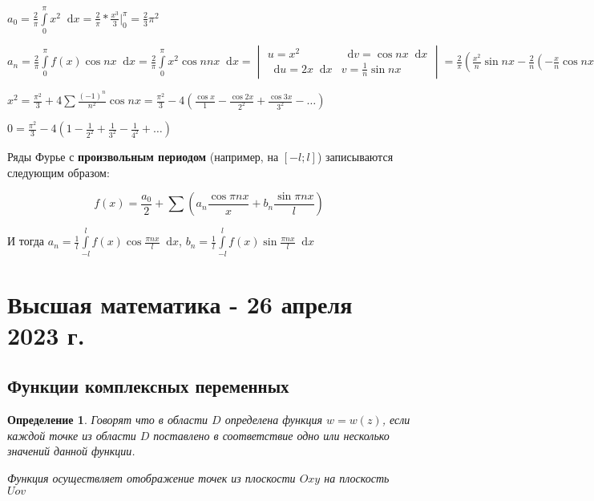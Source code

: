 \documentclass{article}
\newcommand*\diff{\mathop{}\!\mathrm{d}}
\newtheorem{definition}{Определение}
\begin{document}
$a_0 = \frac{2}{\pi} \int\limits_{0}^{\pi} x^2 \diff x = \frac{2}{\pi} * \frac{x^3}{3} \bigg|_{0}^{\pi} = \frac{2}{3} \pi^2$

$a_{n} = \frac{2}{\pi} \int\limits_{0}^{\pi} f(x) \cos n x \diff x = \frac{2}{\pi} \int\limits_{0}^{\pi} x^2 \cos n n x \diff x = \begin{vmatrix}
    u = x^2 & \diff v = \cos n x \diff x \\
    \diff u = 2x \diff x & v = \frac{1}{n} \sin n x
\end{vmatrix} = \frac{2}{\pi} (\frac{x^2}{n} \sin n x - \frac{2}{n} (-\frac{x}{n} \cos n x + \frac{1}{n^2} \sin n x)) \bigg|_{0}^{\pi} = \frac{4}{\pi n^2} (\pi \cos \pi n - 0) = \frac{4 \cos \pi n}{n^2} = \frac{4}{n^2} (-1)^{n}$

\hfill

$x^2 = \frac{\pi^2}{3} + 4 \sum \frac{(-1)^{n}}{n^2} \cos n x = \frac{\pi^2}{3} - 4 (\frac{\cos x}{1} - \frac{\cos 2 x}{2^2} + \frac{\cos 3 x}{3^2} - \dots)$

$0 = \frac{\pi^2}{3} - 4 (1 - \frac{1}{2^2} + \frac{1}{3^2} - \frac{1}{4^2} + \dots)$

\hfill

Ряды Фурье с \textbf{произвольным периодом} (например, на $[-l; l]$) записываются следующим образом:

$$f(x) = \frac{a_0}{2} + \sum (a_{n} \frac{\cos \pi n x}{x} + b_{n} \frac{\sin \pi n x}{l})$$

И тогда $a_{n} = \frac{1}{l} \int\limits_{- l}^{l} f(x) \cos \frac{\pi n x}{l} \diff x$, $b_{n} = \frac{1}{l} \int\limits_{- l}^{l} f(x) \sin \frac{\pi n x}{l} \diff x$

\pagebreak
\section{Высшая математика - 26 апреля 2023 г.}

\subsection{Функции комплексных переменных}

\begin{definition}
Говорят что в области $D$ определена функция $w = w(z)$, если каждой точке из области $D$ поставлено в соответствие одно или несколько значений данной функции.

Функция осуществляет отображение точек из плоскости $O x y$ на плоскость $U o v$
\end{definition}
\end{document}
